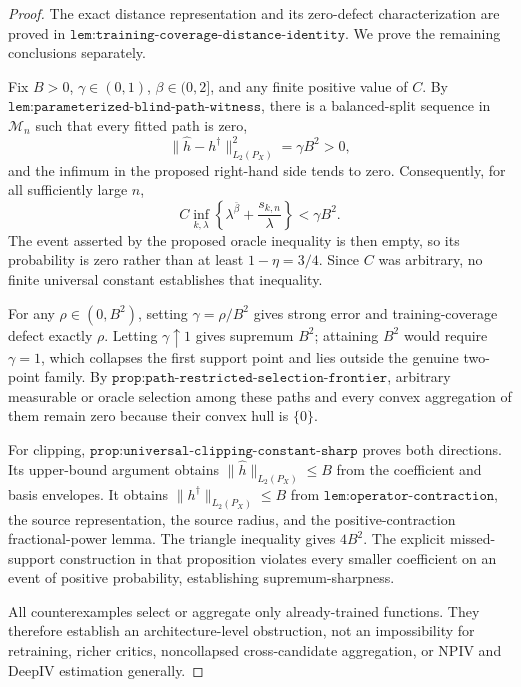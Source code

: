 \begin{proof}
The exact distance representation and its zero-defect characterization are proved in \(\texttt{lem:training-coverage-distance-identity}\). We prove the remaining conclusions separately.

Fix \(B>0\), \(\gamma\in(0,1)\), \(\beta\in(0,2]\), and any finite positive value of \(C\). By \(\texttt{lem:parameterized-blind-path-witness}\), there is a balanced-split sequence in \(\mathcal M_n\) such that every fitted path is zero,
\[
 \|\widehat h-h^\dagger\|_{L_2(P_X)}^2=\gamma B^2>0,
\]
and the infimum in the proposed right-hand side tends to zero. Consequently, for all sufficiently large \(n\),
\[
 C\inf_{k,\lambda}
 \left\{\lambda^{\bar\beta}+\frac{s_{k,n}}{\lambda}\right\}
 <\gamma B^2.
\]
The event asserted by the proposed oracle inequality is then empty, so its probability is zero rather than at least \(1-\eta=3/4\). Since \(C\) was arbitrary, no finite universal constant establishes that inequality.

For any \(\rho\in(0,B^2)\), setting \(\gamma=\rho/B^2\) gives strong error and training-coverage defect exactly \(\rho\). Letting \(\gamma\uparrow1\) gives supremum \(B^2\); attaining \(B^2\) would require \(\gamma=1\), which collapses the first support point and lies outside the genuine two-point family. By \(\texttt{prop:path-restricted-selection-frontier}\), arbitrary measurable or oracle selection among these paths and every convex aggregation of them remain zero because their convex hull is \(\{0\}\).

For clipping, \(\texttt{prop:universal-clipping-constant-sharp}\) proves both directions. Its upper-bound argument obtains \(\|\widehat h\|_{L_2(P_X)}\le B\) from the coefficient and basis envelopes. It obtains \(\|h^\dagger\|_{L_2(P_X)}\le B\) from \(\texttt{lem:operator-contraction}\), the source representation, the source radius, and the positive-contraction fractional-power lemma. The triangle inequality gives \(4B^2\). The explicit missed-support construction in that proposition violates every smaller coefficient on an event of positive probability, establishing supremum-sharpness.

All counterexamples select or aggregate only already-trained functions. They therefore establish an architecture-level obstruction, not an impossibility for retraining, richer critics, noncollapsed cross-candidate aggregation, or NPIV and DeepIV estimation generally.
\end{proof}